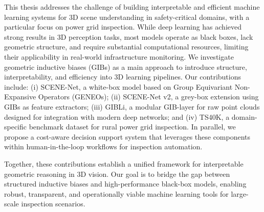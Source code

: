 
%



This thesis addresses the challenge of building interpretable and efficient
machine learning systems for 3D scene understanding in safety-critical domains,
with a particular focus on power grid inspection. While deep learning has
achieved strong results in 3D perception tasks, most models operate as black
boxes, lack geometric structure, and require substantial computational
resources, limiting their applicability in real-world infrastructure
monitoring.
%
We investigate geometric inductive biases (GIBs) as a main approach to
introduce structure, interpretability, and efficiency into 3D learning
pipelines. Our contributions include: (i) SCENE-Net, a white-box model based on
Group Equivariant Non-Expansive Operators (GENEOs); (ii) SCENE-Net v2, a
grey-box extension using GIBs as feature extractors; (iii) GIBLi, a modular
GIB-layer for raw point clouds designed for integration with modern deep
networks; and (iv) TS40K, a domain-specific benchmark dataset for rural power grid
inspection. In parallel, we propose a cost-aware decision support system that
leverages these components within human-in-the-loop workflows for inspection
automation.

Together, these contributions establish a unified framework for interpretable
geometric reasoning in 3D vision. Our goal is to bridge the gap between
structured inductive biases and high-performance black-box models, enabling
robust, transparent, and operationally viable machine learning tools for
large-scale inspection scenarios.


